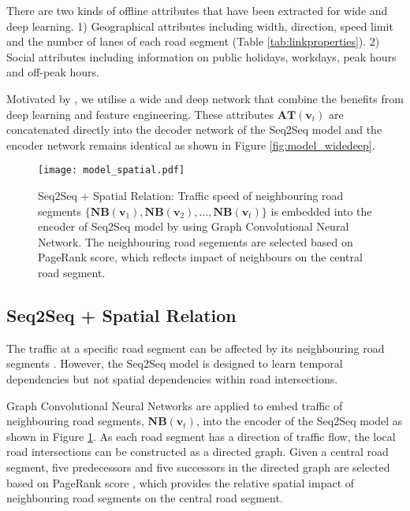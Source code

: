 There are two kinds of offline attributes that have been extracted for wide and deep learning. 1) Geographical attributes including width, direction, speed limit and the number of lanes of each road segment (Table \ref{tab:linkproperties}). 2) Social attributes including information on public holidays, workdays, peak hours and off-peak hours.  

Motivated by \cite{cheng2016wide}, we utilise a wide and deep network that combine the benefits from deep learning and feature engineering. These attributes $\bm{AT} (\bm{v}_t)$ are concatenated directly into the decoder network of the Seq2Seq model and the encoder network remains identical as shown in Figure  \ref{fig:model_widedeep}.


\begin{figure}[htbp]
\centering
\texttt{[image: model\_spatial.pdf]}
\caption{Seq2Seq + Spatial Relation: Traffic speed of neighbouring road segments $\{\bm{NB} (\bm{v}_1), \bm{NB} (\bm{v}_2), \dots, \bm{NB} (\bm{v}_t)\}$ is embedded into the encoder of Seq2Seq model by using Graph Convolutional Neural Network. The neighbouring road segements are selected based on PageRank score, which reflects impact of neighbours on the central road segment.}
\label{fig:model_spatial}
\end{figure}


\subsection{Seq2Seq + Spatial Relation}

The traffic at a specific road segment can be affected by its neighbouring road segments  \cite{yu2017spatio}. However, the Seq2Seq model is designed to learn temporal dependencies but not spatial dependencies within road intersections. 

Graph Convolutional Neural Networks \cite{niepert2016learning} are applied to embed traffic of neighbouring road segments, $\bm{NB} (\bm{v}_t)$, into the encoder of the Seq2Seq model as shown in Figure \ref{fig:model_spatial}. As each road segment has a direction of traffic flow, the local road intersections can be constructed as a directed graph. Given a central road segment, five predecessors and five successors in the directed graph are selected based on PageRank score \cite{page1999pagerank}, which provides the relative spatial impact of neighbouring road segments on the central road segment.



